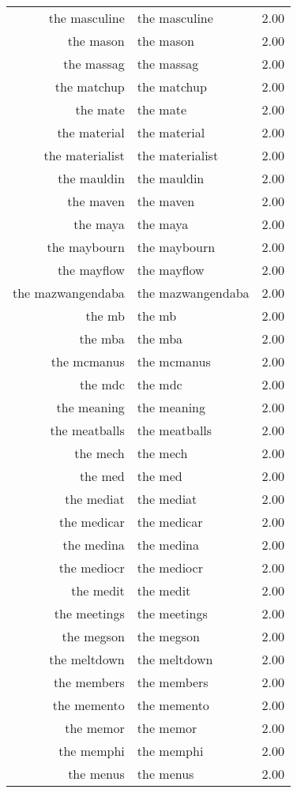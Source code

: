 \begin{table}[ht]
\begin{tabular}{rlr}
  the masculine & the masculine & 2.00 \\ 
  the mason & the mason & 2.00 \\ 
  the massag & the massag & 2.00 \\ 
  the matchup & the matchup & 2.00 \\ 
  the mate & the mate & 2.00 \\ 
  the material & the material & 2.00 \\ 
  the materialist & the materialist & 2.00 \\ 
  the mauldin & the mauldin & 2.00 \\ 
  the maven & the maven & 2.00 \\ 
  the maya & the maya & 2.00 \\ 
  the maybourn & the maybourn & 2.00 \\ 
  the mayflow & the mayflow & 2.00 \\ 
  the mazwangendaba & the mazwangendaba & 2.00 \\ 
  the mb & the mb & 2.00 \\ 
  the mba & the mba & 2.00 \\ 
  the mcmanus & the mcmanus & 2.00 \\ 
  the mdc & the mdc & 2.00 \\ 
  the meaning & the meaning & 2.00 \\ 
  the meatballs & the meatballs & 2.00 \\ 
  the mech & the mech & 2.00 \\ 
  the med & the med & 2.00 \\ 
  the mediat & the mediat & 2.00 \\ 
  the medicar & the medicar & 2.00 \\ 
  the medina & the medina & 2.00 \\ 
  the mediocr & the mediocr & 2.00 \\ 
  the medit & the medit & 2.00 \\ 
  the meetings & the meetings & 2.00 \\ 
  the megson & the megson & 2.00 \\ 
  the meltdown & the meltdown & 2.00 \\ 
  the members & the members & 2.00 \\ 
  the memento & the memento & 2.00 \\ 
  the memor & the memor & 2.00 \\ 
  the memphi & the memphi & 2.00 \\ 
  the menus & the menus & 2.00 \\ 

\end{tabular}
\end{table}
